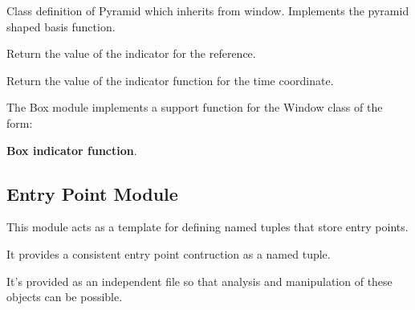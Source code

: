 \documentclass[letterpaper,10pt,english]{sphinxmanual}
\begin{document}
\begin{fulllineitems}
\label{applications/applications.doc:pyramid.Pyramid}
Class definition of Pyramid which inherits from window. Implements the pyramid shaped basis function.

\begin{fulllineitems}
\label{applications/applications.doc:pyramid.Pyramid.ref_indicator}
Return the value of the indicator for the reference.

\end{fulllineitems}


\begin{fulllineitems}
\label{applications/applications.doc:pyramid.Pyramid.time_indicator}
Return the value of the indicator function for the time coordinate.

\end{fulllineitems}


\end{fulllineitems}


The Box module implements a support function for the Window class of the form:

\textbf{Box indicator function}.


\subsection{Entry Point Module}
\label{applications/applications.doc:entry-point-module}\label{applications/applications.doc:module-entryPoints}
This module acts as a template for defining named tuples that store entry points.

It provides a consistent entry point contruction as a named tuple.

It's provided as an independent file so that analysis and manipulation of these objects can be possible.
\end{document}
